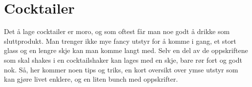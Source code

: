\chapter{Cocktailer}
\label{chap:cocktail}
Det å lage cocktailer er moro, og som oftest får man noe godt å drikke som sluttprodukt. Man trenger ikke mye fancy utstyr for å komme i gang, et stort glass og en lengre skje kan man komme langt med. Selv en del av de oppskriftene som skal shakes i en cocktailshaker kan lages med en skje, bare rør fort og godt nok. Så, her kommer noen tips og triks, en kort oversikt over ymse utstyr som kan gjøre livet enklere, og en liten bunch med oppskrifter.